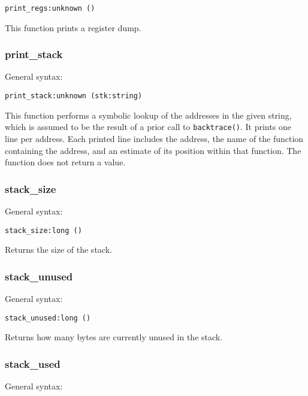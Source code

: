 \documentclass[twoside,english]{article}
\newenvironment{vindent}
{\begin{list}{}{\setlength{\listparindent}{6pt}}
\item[]}
{\end{list}}
\begin{document}
\begin{vindent}
\begin{verbatim}
print_regs:unknown ()
\end{verbatim}
\end{vindent}
This function prints a register dump.


\subsubsection{print\_stack}
General syntax:

\begin{vindent}
\begin{verbatim}
print_stack:unknown (stk:string)
\end{verbatim}
\end{vindent}
This function performs a symbolic lookup of the addresses in the given string,
which is assumed to be the result of a prior call to \texttt{backtrace()}.
It prints one line per address. Each printed line includes the address, the
name of the function containing the address, and an estimate of its position
within that function. The function does not return a value.


\subsubsection{stack\_size}
General syntax:

\begin{vindent}
\begin{verbatim}
stack_size:long ()
\end{verbatim}
\end{vindent}
Returns the size of the stack.


\subsubsection{stack\_unused}
General syntax:

\begin{vindent}
\begin{verbatim}
stack_unused:long ()
\end{verbatim}
\end{vindent}
Returns how many bytes are currently unused in the stack.


\subsubsection{stack\_used}
General syntax:
\end{document}
